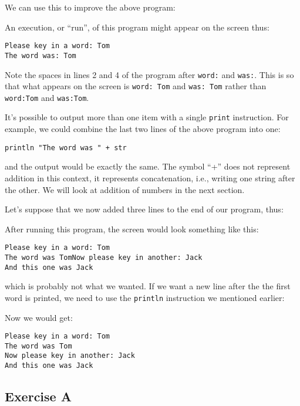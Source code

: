 We can use this to improve the above program:


An execution, or ``run'', of this program might appear on the screen thus:
\begin{Verbatim}
Please key in a word: Tom
The word was: Tom
\end{Verbatim}

Note the spaces in lines 2 and 4 of the program after \verb!word:! and \verb!was:!.
This is so that what appears on the screen is \verb!word: Tom! and
\verb!was: Tom! rather than \verb!word:Tom! and \verb!was:Tom!.

It's possible to output more than one item with a single \verb!print! instruction.
For example, we could combine the last two lines of the above program into one:

\begin{Verbatim}
println "The word was " + str
\end{Verbatim}

and the output would be exactly the same. The symbol ``+'' does not
represent addition in this context, it represents concatenation, i.e.,
writing one string after the other. We will look at addition of numbers in the next section.

Let's suppose that we now added three lines to the end of our program, thus:


After running this program, the screen would look something like this:
\begin{Verbatim}
Please key in a word: Tom
The word was TomNow please key in another: Jack
And this one was Jack
\end{Verbatim}

which is probably not what we wanted.  If we want a new line after the
the first word is printed, we need to use the \verb!println! instruction we mentioned earlier:


Now we would get:
\begin{Verbatim}
Please key in a word: Tom
The word was Tom
Now please key in another: Jack
And this one was Jack
\end{Verbatim}


\subsection*{Exercise A}

